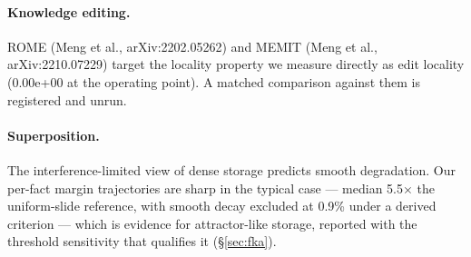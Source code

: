 \paragraph{Knowledge editing.} ROME (Meng et al., arXiv:2202.05262) and MEMIT (Meng et al.,
arXiv:2210.07229) target the locality property we measure directly as
edit locality (0.00e+00 at the operating point). A matched comparison against them is registered and
unrun.

\paragraph{Superposition.} The interference-limited view of dense storage predicts smooth
degradation. Our per-fact margin trajectories are sharp in the typical case --- median 5.5$\times$
the uniform-slide reference, with smooth decay excluded at 0.9\% under a derived criterion --- which
is evidence for attractor-like storage, reported with the threshold sensitivity that qualifies it
(\S\ref{sec:fka}).
